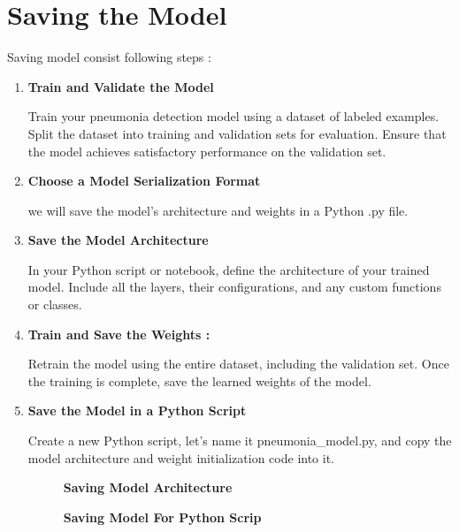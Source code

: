 \section{Saving the Model}

Saving model consist following steps :

\begin{enumerate} [label=Step \arabic*:]
	
	\item \textbf {	Train and Validate the Model }
	
	Train your pneumonia detection model using a dataset of labeled examples. Split the dataset into training and validation sets for evaluation. Ensure that the model achieves satisfactory performance on the validation set.
	
	
	\item \textbf {	Choose a Model Serialization Format }
	
	we will save the model's architecture and weights in a Python .py file.
	
	\item \textbf {	Save the Model Architecture }
	
	In your Python script or notebook, define the architecture of your trained model. Include all the layers, their configurations, and any custom functions or classes.
	
	
	
	\item \textbf {	Train and Save the Weights :}
	
	Retrain the model using the entire dataset, including the validation set. Once the training is complete, save the learned weights of the model.
	
	
	\item \textbf {Save the Model in a Python Script}
	
	Create a new Python script, let's name it pneumonia\_model.py, and copy the model architecture and weight initialization code into it.
	
	
	\begin{figure}
		\centering
		\caption{\textbf{Saving Model Architecture}}
		\label{fig: Saving Model Architecture}
	\end{figure}
	
	
	
	
	
	
	
	\begin{figure}
		\centering
		\caption{\textbf{Saving Model For Python Scrip}}
		\label{fig: Saving Model For Python Script}
	\end{figure}
	
\end{enumerate}


